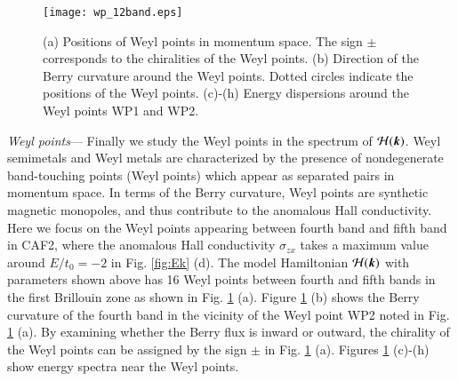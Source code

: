 \documentclass[letter,twocolumn,amsmath,amssymb,superscriptaddress]{jpsj3}
\newcommand{\vM}{\bm{M}}
\newcommand{\vk}{\bm{k}}
\begin{document}


\begin{figure}[t]
 \leavevmode\texttt{[image: wp\_12band.eps]} %
 \caption{
 (a) Positions of Weyl points in momentum space. 
 The sign $\pm$ corresponds to the chiralities of the Weyl points.
 (b) Direction of the Berry curvature around the Weyl points. Dotted circles indicate the positions of the Weyl points.
(c)-(h) Energy dispersions around the Weyl points WP1 and WP2.  }
 \label{WP}
\end{figure}




{\it Weyl points}---
Finally we study the Weyl points in the spectrum of ${\cal H}(\vk)$.
Weyl semimetals and Weyl metals are characterized by the presence of nondegenerate band-touching points (Weyl points) which appear as separated pairs in momentum space\cite{Wan2011,Burkov2011}.
In terms of the Berry curvature, Weyl points are synthetic magnetic monopoles, and thus contribute to the anomalous Hall conductivity.
Here we focus on the Weyl points appearing between fourth band and fifth band in CAF2, where the anomalous Hall conductivity $\sigma_{zx}$ takes a maximum value around $E/t_0=-2$ in Fig. \ref{fig:Ek} (d).
The model Hamiltonian ${\cal H}(\vk)$ with parameters shown above has 16 Weyl points between fourth and fifth bands in the first Brillouin zone as shown in Fig. \ref{WP} (a). 
Figure  \ref{WP} (b) shows the Berry curvature\cite{Xiao2010} of the fourth band
 in the vicinity of the Weyl point WP2 noted in  Fig. \ref{WP} (a).
 By examining whether the Berry flux is inward or outward, the chirality of the Weyl points can be assigned by the sign $\pm$ in Fig. \ref{WP} (a).
Figures \ref{WP} (c)-(h) show energy spectra near the Weyl points.
\end{document}
